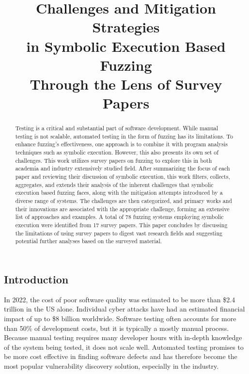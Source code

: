 \documentclass{article}
\title{Challenges and Mitigation Strategies\\in Symbolic Execution Based Fuzzing\\Through the Lens of Survey Papers}
\begin{document}


\maketitle
\begin{multicols}{2}
    \begin{abstract}
        Testing is a critical and substantial part of software development. While manual testing is not scalable, automated testing in the form of fuzzing has its limitations. To enhance fuzzing's effectiveness, one approach is to combine it with program analysis techniques such as symbolic execution. However, this also presents its own set of challenges. This work utilizes survey papers on fuzzing to explore this in both academia and industry extensively studied field. %
        After summarizing the focus of each paper and reviewing their discussion of symbolic execution, this work filters, collects, aggregates, and extends their analysis of the inherent challenges that symbolic execution based fuzzing faces, along with the mitigation attempts introduced by a diverse range of systems. The challenges are then categorized, and primary works and their innovations are associated with the appropriate challenge, forming an extensive list of approaches and examples. A total of 78 fuzzing systems employing symbolic execution were identified from 17 survey papers. %
        This paper concludes by discussing the limitations of using survey papers to digest vast research fields and suggesting potential further analyses based on the surveyed material.
    \end{abstract}

    \section{Introduction}
    In 2022, the cost of poor software quality was estimated to be more than \$2.4 trillion in the US alone.\cite{CostPoorSoftware} Individual cyber attacks have had an estimated financial impact of up to \$8 billion worldwide.\cite{Demystifying} Software testing often accounts for more than 50\% of development costs\cite{Orchestrated}, but it is typically a mostly manual process\cite{PreliminaryAssessment}. Because manual testing requires many developer hours with in-depth knowledge of the system being tested, it does not scale well. Automated testing promises to be more cost effective in finding software defects and has therefore become the most popular vulnerability discovery solution, especially in the industry.\cite{FuzzingASurvey}


\end{multicols}
\end{document}
